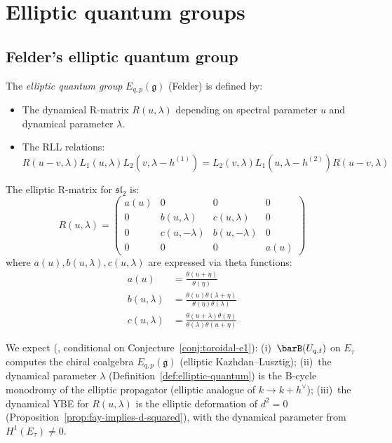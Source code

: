\section{Elliptic quantum groups}
\label{sec:elliptic-quantum}

\subsection{Felder's elliptic quantum group}

\begin{definition}\label{def:elliptic-quantum}
The \emph{elliptic quantum group} $E_{q,p}(\mathfrak{g})$ (Felder) is defined by:
\begin{itemize}
\item The dynamical R-matrix $R(u, \lambda)$ depending on spectral parameter $u$ 
and dynamical parameter $\lambda$.
\item The RLL relations:
\[
R(u-v, \lambda) L_1(u, \lambda) L_2(v, \lambda - h^{(1)}) = L_2(v, \lambda) L_1(u, \lambda - h^{(2)}) R(u-v, \lambda)
\]
\end{itemize}
\end{definition}

\begin{definition}\label{def:elliptic-r}
The elliptic R-matrix for $\mathfrak{sl}_2$ is:
\[
R(u, \lambda) = \begin{pmatrix}
a(u) & 0 & 0 & 0 \\
0 & b(u, \lambda) & c(u, \lambda) & 0 \\
0 & c(u, -\lambda) & b(u, -\lambda) & 0 \\
0 & 0 & 0 & a(u)
\end{pmatrix}
\]
where $a(u), b(u, \lambda), c(u, \lambda)$ are expressed via theta functions:
\begin{align*}
a(u) &= \frac{\theta(u + \eta)}{\theta(\eta)} \\
b(u, \lambda) &= \frac{\theta(u)\theta(\lambda + \eta)}{\theta(\eta)\theta(\lambda)} \\
c(u, \lambda) &= \frac{\theta(u + \lambda)\theta(\eta)}{\theta(\lambda)\theta(u + \eta)}
\end{align*}
\end{definition}


\begin{remark}
\label{rem:elliptic-qg-bar}
We expect (\ClaimStatusConjectured, conditional on Conjecture~\ref{conj:toroidal-e1}):
(i)~$\barB(U_{q,t})$ on $E_\tau$ computes the chiral coalgebra $E_{q,p}(\mathfrak{g})$ (elliptic Kazhdan--Lusztig);
(ii)~the dynamical parameter $\lambda$ (Definition~\ref{def:elliptic-quantum}) is the B-cycle monodromy of the elliptic propagator (elliptic analogue of $k \to k + h^\vee$);
(iii)~the dynamical YBE for $R(u,\lambda)$ is the elliptic deformation of $d^2 = 0$ (Proposition~\ref{prop:fay-implies-d-squared}), with the dynamical parameter from $H^1(E_\tau) \neq 0$.
\end{remark}

